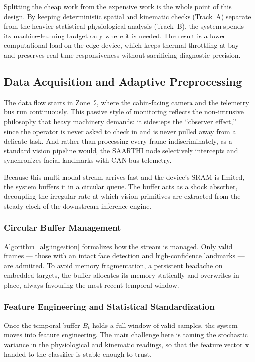 Splitting the cheap work from the expensive work is the whole point of this
design. By keeping deterministic spatial and kinematic checks (Track~A) separate
from the heavier statistical physiological analysis (Track~B), the system spends
its machine-learning budget only where it is needed. The result is a lower
computational load on the edge device, which keeps thermal throttling at bay and
preserves real-time responsiveness without sacrificing diagnostic precision.

\subsection{Data Acquisition and Adaptive Preprocessing}

The data flow starts in Zone~2, where the cabin-facing camera and the telemetry
bus run continuously. This passive style of monitoring reflects the
non-intrusive philosophy that heavy machinery demands: it sidesteps the
``observer effect,'' since the operator is never asked to check in and is never
pulled away from a delicate task. And rather than processing every frame
indiscriminately, as a standard vision pipeline would, the SAARTHI node
selectively intercepts and synchronizes facial landmarks with CAN bus telemetry.

Because this multi-modal stream arrives fast and the device's SRAM is limited,
the system buffers it in a circular queue. The buffer acts as a shock absorber,
decoupling the irregular rate at which vision primitives are extracted from the
steady clock of the downstream inference engine.

\subsubsection{Circular Buffer Management}

Algorithm~\ref{alg:ingestion} formalizes how the stream is managed. Only valid
frames --- those with an intact face detection and high-confidence landmarks ---
are admitted. To avoid memory fragmentation, a persistent headache on embedded
targets, the buffer allocates its memory statically and overwrites in place,
always favouring the most recent temporal window.

\subsubsection{Feature Engineering and Statistical Standardization}

Once the temporal buffer $B_t$ holds a full window of valid samples, the system
moves into feature engineering. The main challenge here is taming the stochastic
variance in the physiological and kinematic readings, so that the feature vector
$\mathbf{x}$ handed to the classifier is stable enough to trust.

